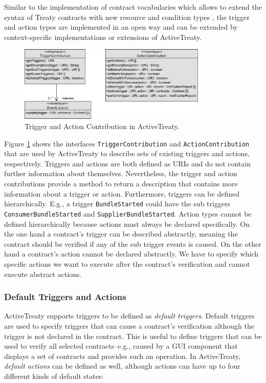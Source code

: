 \documentclass{llncs}
\begin{document}
Similar to the implementation of contract vocabularies which allows to extend the syntax of Treaty contracts with new resource and condition types \cite{Treaty.JOT2009}, the trigger and action types are implemented in an open way and can be extended by context-specific implementations or extensions of ActiveTreaty.

\begin{figure}[htbp]
  \centering
  \includegraphics[width=0.8\textwidth]{ContributorModel1.pdf}
  \caption{Trigger and Action Contribution in ActiveTreaty.}
  \label{fig:contribution}
\end{figure}

Figure \ref{fig:contribution} shows the interfaces \texttt{TriggerContribution} and \texttt{Action\-Con\-tri\-bu\-tion} that are used by ActiveTreaty to describe sets of existing triggers and actions, respectively. Triggers and actions are both defined as URIs and do not contain further information about themselves. Nevertheless, the trigger and action contributions provide a method to return a description that contains more information about a trigger or action. Furthermore, triggers can be defined hierarchically. E.g., a trigger \texttt{BundleStarted} could have the sub triggers \texttt{ConsumerBundleStarted} and \texttt{SupplierBundleStarted}. Action types cannot be defined hierarchically because actions must always be declared specifically. On the one hand a contract's trigger can be described abstractly, meaning the contract should be verified if any of the sub trigger events is caused. On the other hand a contract's action cannot be declared abstractly. We have to specify which specific actions we want to execute after the contract's verification and cannot execute abstract actions.

\subsubsection{Default Triggers and Actions}

ActiveTreaty supports triggers to be defined as \textit{default triggers}. Default triggers are used to specify triggers that can cause a contract's verification although the trigger is not declared in the contract. This is useful to define triggers that can be used to verify all selected contracts--e.g., caused by a GUI component that displays a set of contracts and provides such an operation. In ActiveTreaty, \textit{default actions} can be defined as well, although actions can have up to four different kinds of default states:
\end{document}
